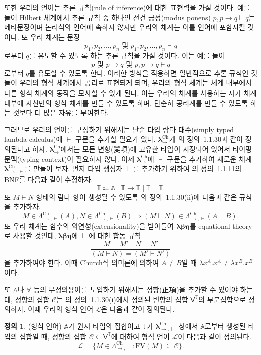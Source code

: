 \documentclass[10pt,twocolumn]{article}
\theoremstyle{definition}
\newtheorem{definition}[theorem]{정의}
\newcommand{\lch}{\bm\lambda_\to^{\text{Ch}}}
\newcommand{\lchh}{\bm\lambda_{\to,\vdash}^{\text{Ch}}}
\newcommand{\Lchh}{\Lambda_{\to,\vdash}^{\text{Ch}}}
\begin{document}
또한 우리의 언어는 추론 규칙(rule of inference)에 대한 표현력을 가질 것이다. 예를 들어 Hilbert 체계에서 추론 규칙 중 하나인 전건 긍정(modus ponens) $p, p\to q\vdash q$는 메타문장이며 논리식의 언어에 속하지 않지만 우리의 체계는 이를 언어에 포함시킬 것이다. 또 우리 체계는 문장
$$p_1,p_2,\ldots,p_n\text{\ \ 및\ \ }p_1, p_2, \ldots, p_n\vdash q$$
로부터 $q$를 유도할 수 있도록 하는 추론 규칙을 가질 것이다. 이는 예를 들어
$$p\text{\ \ 및\ \ }p\to q\text{\ \ 및\ \ }p, p\to q\vdash q$$
로부터 $q$를 유도할 수 있도록 한다. 이러한 방식을 적용하면 일반적으로 추론 규칙인 것들이 우리의 형식 체계에서 공리로 표현되게 되며, 우리의 형식 체계는 체계 내부에서 다른 형식 체계의 동작을 모사할 수 있게 된다. 이는 우리의 체계를 사용하는 자가 체계 내부에 자신만의 형식 체계를 만들 수 있도록 하며, 단순히 공리계를 만들 수 있도록 하는 것보다 더 많은 자유를 부여한다.

그러므로 우리의 언어를 구성하기 위해서는 단순 타입 람다 대수(simply typed lambda calculus)에 $\vdash$ 구문을 추가할 필요가 있다. $\lch$가 \cite{luswt}의 정의~1.1.30과 같이 정의된다고 하자. $\lch$에서는 모든 변항(變項)에 고유한 타입이 지정되어 있어서 타이핑 문맥(typing context)이 필요하지 않다. 이제 $\lch$에 $\vdash$ 구문을 추가하여 새로운 체계 $\lchh$를 만들어 보자. 먼저 타입 생성자 $\vdash$를 추가하기 위하여 \cite{luswt}의 정의~1.1.11의 BNF를 다음과 같이 수정하자.
$$\mathds T \Coloneqq \mathbb A\mid\mathds T\to\mathds T\mid\mathds T\vdash\mathds T.$$
또 $M\vdash N$ 형태의 람다 항이 생성될 수 있도록 \cite{luswt}의 정의~1.1.30(ii)에 다음과 같은 규칙을 추가하자.
$$M\in\Lchh(A), N\in\Lchh(B)\Rightarrow (M\vdash N)\in\Lchh(A\vdash B).$$
또 우리 체계는 함수의 외연성(extensionality)을 받아들여 $\bm{\lambda\beta\eta}$를 equational theory로 사용할 것인데, $\bm{\lambda\beta\eta}$에 $\vdash$에 대한 합동 규칙
$$\dfrac{M=M'\quad N=N'}{(M\vdash N)=(M'\vdash N')}$$
을 추가하여야 한다. 이때 Church식 의미론에 의하여 $A\ne B$일 때 $\lambda x^A.x^A\ne\lambda x^B.x^B$이다.

또 $\land$나 $\forall$ 등의 무정의용어를 도입하기 위해서는 정항(正項)을 추가할 수 있어야 하는데, 정항의 집합 $\mathcal C$는 \cite{luswt}의 정의~1.1.30(i)에서 정의된 변항의 집합 $\mathsf V^{\mathds T}$의 부분집합으로 정의하자. 이때 우리의 형식 언어 $\mathcal L$은 다음과 같이 정의된다.

\begin{definition}(형식 언어)
	$\mathbb A$가 원시 타입의 집합이고 $\mathds T$가 $\lchh$ 상에서 $\mathbb A$로부터 생성된 타입의 집합일 때, 정항의 집합 $\mathcal C\subseteq \mathsf V^{\mathds T}$에 대하여 형식 언어 $\mathcal L$이 다음과 같이 정의된다.
	$$\mathcal L = \{M\in\Lchh: \mathrm{FV}(M)\subseteq\mathcal C\}.$$
\end{definition}
\end{document}
